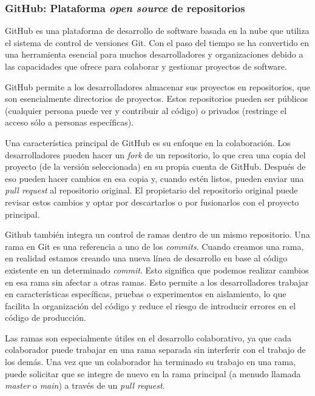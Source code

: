        \subsubsection{GitHub: Plataforma \textit{open source} de repositorios}
        GitHub \cite{wiki:github} es una plataforma de desarrollo de software basada en la nube que utiliza el sistema de control de versiones Git. Con el paso del tiempo se ha convertido en una herramienta esencial para muchos desarrolladores y organizaciones debido a las capacidades que ofrece para colaborar y gestionar proyectos de software.
        
        GitHub permite a los desarrolladores almacenar sus proyectos en repositorios, que son esencialmente directorios de proyectos. Estos repositorios pueden ser públicos (cualquier persona puede ver y contribuir al código) o privados (restringe el acceso sólo a personas específicas).
        
        Una característica principal de GitHub es su enfoque en la colaboración. Los desarrolladores pueden hacer un \textit{fork} de un repositorio, lo que crea una copia del proyecto (de la versión seleccionada) en su propia cuenta de GitHub. Después de eso pueden hacer cambios en esa copia y, cuando estén listos, pueden enviar una \textit{pull request} al repositorio original. El propietario del repositorio original puede revisar estos cambios y optar por descartarlos o por fusionarlos con el proyecto principal.
        
        Github también integra un control de ramas dentro de un mismo repositorio. Una rama en Git es una referencia a uno de los \textit{commits}. Cuando creamos una rama, en realidad estamos creando una nueva línea de desarrollo en base al código existente en un determinado \textit{commit}. Esto significa que podemos realizar cambios en esa rama sin afectar a otras ramas. Esto permite a los desarrolladores trabajar en características específicas, pruebas o experimentos en aislamiento, lo que facilita la organización del código y reduce el riesgo de introducir errores en el código de producción.
        
        Las ramas son especialmente útiles en el desarrollo colaborativo, ya que cada colaborador puede trabajar en una rama separada sin interferir con el trabajo de los demás. Una vez que un colaborador ha terminado su trabajo en una rama, puede solicitar que se integre de nuevo en la rama principal (a menudo llamada \textit{master} o \textit{main}) a través de un \textit{pull request}.     
        
